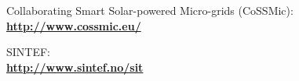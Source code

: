 \begin{thebibliography}{1}


     Collaborating Smart Solar-powered Micro-grids (CoSSMic):\\ \textbf{\url{http://www.cossmic.eu/}}

   SINTEF: \\
 \textbf{ \url{ http://www.sintef.no/sit}}
  

 

  \end{thebibliography}